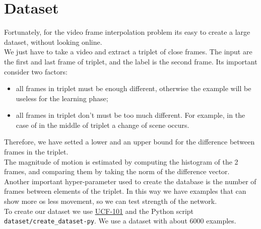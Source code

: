 \documentclass[11pt, a4paper]{article}
\begin{document}
	\section{Dataset}
	Fortunately, for the video frame interpolation problem its easy to create a large dataset, without looking online.\\
	We just have to take a video and extract a triplet of close frames. The input are the first and last frame of triplet, and the label is the second frame. Its important consider two factors:
	\begin{itemize}
		\item all frames in triplet must be enough different, otherwise the example will be useless for the learning phase;
		\item all frames in triplet don't must be too much different. For example, in the case of in the middle of triplet a change of scene occurs. 
	\end{itemize}
	Therefore, we have setted a lower and an upper bound for the difference between frames in the triplet.\\
	The magnitude of motion is estimated by computing the histogram of the 2 frames, and comparing them by taking the norm of the difference vector. \\
	Another important hyper-parameter used to create the database is the number of frames between elements of the triplet. In this way we have examples that can show more os less movement, so we can test strength of the network.\\
	To create our dataset we use \href{https://www.crcv.ucf.edu/data/UCF101.php}{UCF-101} and the Python script\\ \texttt{dataset/create\_dataset-py}. We use a dataset with about 6000 examples.
\end{document}
